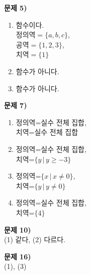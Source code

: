 \documentclass{oblivoir}
\newcounter{num}
\newcommand\an[1]{\par\bigskip\noindent\textbf{문제 #1)}\\}
\newcommand\ba{\,|\,}
\begin{document}
\begin{minipage}{0.49\textwidth}
%
\an{5}
\begin{enumerate}[topsep=0pt]
\item
함수이다.\\
\(정의역=\{a,b,c\}\),\\
\(공역=\{1,2,3\}\),\\
\(치역=\{1\}\)
\item
함수가 아니다.
\item
함수가 아니다.
\end{enumerate}

%
\an{7}
\begin{enumerate}[topsep=0pt]
\item
정의역=실수 전체 집합,\\
치역=실수 전체 집합
\item
정의역=실수 전체 집합,\\
치역=\(\{y\ba y\ge-3\}\)
\item
정의역=\(\{x\ba x\neq0\}\),\\
치역=\(\{y\ba y\neq0\}\)
\item
정의역=실수 전체 집합,\\
치역=\(\{4\}\)
\end{enumerate}

%
\an{10}
(1) 같다,\qquad
(2) 다르다.

%
\an{16}
(1), (3)
\end{minipage}
\end{document}
